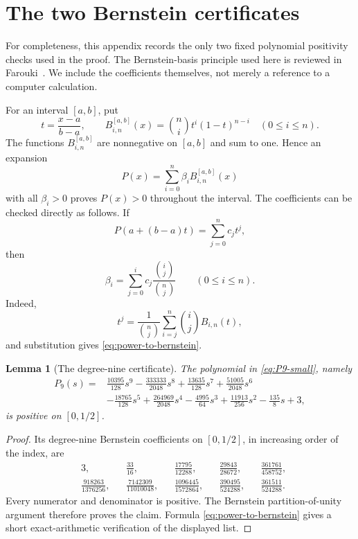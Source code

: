 \documentclass[11pt]{article}
\newtheorem{lemma}[theorem]{Lemma}
\begin{document}
\section{The two Bernstein certificates}\label{app:bernstein}

For completeness, this appendix records the only two fixed polynomial
positivity checks used in the proof.  The Bernstein-basis principle used
here is reviewed in Farouki~\cite{Farouki2012}.  We include the coefficients themselves,
not merely a reference to a computer calculation.

For an interval \([a,b]\), put
\[
        t=\frac{x-a}{b-a},
        \qquad
        B^{[a,b]}_{i,n}(x)=\binom ni t^i(1-t)^{n-i}
        \quad(0\le i\le n).
\]
The functions \(B^{[a,b]}_{i,n}\) are nonnegative on \([a,b]\) and sum to
one.  Hence an expansion
\[
        P(x)=\sum_{i=0}^n \beta_i B^{[a,b]}_{i,n}(x)
\]
with all \(\beta_i>0\) proves \(P(x)>0\) throughout the interval.  The
coefficients can be checked directly as follows.  If
\[
        P(a+(b-a)t)=\sum_{j=0}^n c_jt^j,
\]
then
\begin{equation}\label{eq:power-to-bernstein}
        \beta_i=
        \sum_{j=0}^i c_j\frac{\binom ij}{\binom nj}
        \qquad(0\le i\le n).
\end{equation}
Indeed,
\[
        t^j=\frac1{\binom nj}
             \sum_{i=j}^n\binom ij B_{i,n}(t),
\]
and substitution gives \eqref{eq:power-to-bernstein}.

\begin{lemma}[The degree-nine certificate]\label{lem:bernstein-P9}
The polynomial in \eqref{eq:P9-small}, namely
\begin{align*}
 P_9(s)={}&
 \frac{10395}{128}s^9
 -\frac{333333}{2048}s^8
 +\frac{13635}{128}s^7
 +\frac{51005}{2048}s^6\\
 &-\frac{18765}{128}s^5
 +\frac{264969}{2048}s^4
 -\frac{4995}{64}s^3
 +\frac{11913}{256}s^2
 -\frac{135}{8}s+3,
\end{align*}
is positive on \([0,1/2]\).
\end{lemma}

\begin{proof}
Its degree-nine Bernstein coefficients on \([0,1/2]\), in increasing order
of the index, are
\begin{align*}
 &3,
 &&\frac{33}{16},
 &&\frac{17795}{12288},
 &&\frac{29843}{28672},
 &&\frac{361761}{458752},\\[1mm]
 &\frac{918263}{1376256},
 &&\frac{7142309}{11010048},
 &&\frac{1096445}{1572864},
 &&\frac{390495}{524288},
 &&\frac{361511}{524288}.
\end{align*}
Every numerator and denominator is positive.  The Bernstein
partition-of-unity argument therefore proves the claim.  Formula
\eqref{eq:power-to-bernstein} gives a short exact-arithmetic verification of
the displayed list.
\end{proof}
\end{document}
